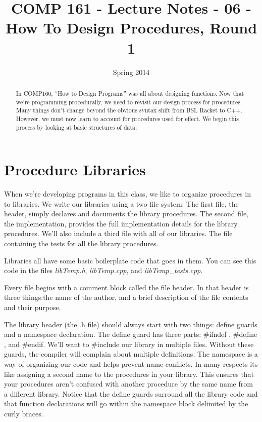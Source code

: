 \documentclass[]{tufte-handout}
\title{COMP 161 - Lecture Notes - 06 - How To Design Procedures, Round 1}
\date{Spring 2014}
\begin{document}
 
\maketitle

\begin{abstract}
In COMP160, ``How to Design Programs'' was all about designing functions.  Now that we're programming procedurally, we need to revisit our design process for procedures.  Many things don't change beyond the obvious syntax shift from BSL Racket to C++.  However, we must now learn to account for procedures used for effect. We begin this process by looking at basic structures of data.
\end{abstract}

\section{Procedure Libraries}

When we're developing programs in this class, we like to organize procedures in to libraries. We write our libraries using a two file system. The first file, the header, simply declares and documents the library procedures. The second file, the implementation, provides the full implementation details for the library procedures. We'll also include a third file with all of our libraries. The file containing the tests for all the library procedures. 

Libraries all have some basic boilerplate code that goes in them. You can see this code in the files \textit{libTemp.h}, \textit{libTemp.cpp}, and \textit{libTemp\_tests.cpp}. 

Every file begins with a comment block called the file header. In that header is three things:the name of the author, and a brief description of the file contents and their purpose. 

The library header (the .h file) should always start with two things: define guards and a namespace declaration. The define guard has three parts: \#ifndef , \#define , and \#endif. We'll want to \#include our library in multiple files. Without these guards, the compiler will complain about multiple definitions.  The namespace is a way of organizing our code and helps prevent name conflicts.  In many respects its like assigning a second name to the procedures in your library. This ensures that your procedures aren't confused with another procedure by the same name from a different library. Notice that the define guards surround all the library code and that function declarations will go within the namespace block delimited by the curly braces.
\end{document}
